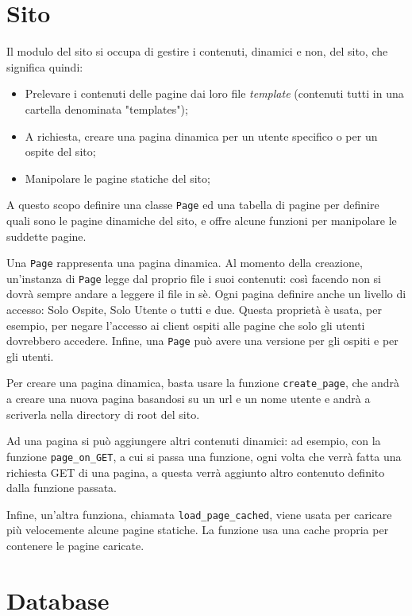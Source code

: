 \documentclass[a4paper,12pt]{report}
\begin{document}
\section{Sito}

Il modulo del sito si occupa di gestire i contenuti, dinamici e non, del sito, che significa quindi:

\begin{itemize}
\item Prelevare i contenuti delle pagine dai loro file \textit{template} (contenuti tutti in una cartella denominata "templates");
\item A richiesta, creare una pagina dinamica per un utente specifico o per un ospite del sito;
\item Manipolare le pagine statiche del sito;
\end{itemize}

A questo scopo definire una classe \texttt{Page} ed una tabella di pagine per definire quali sono le pagine dinamiche del sito, e offre alcune funzioni per manipolare le suddette pagine.

Una \texttt{Page} rappresenta una pagina dinamica. Al momento della creazione, un'instanza di \texttt{Page} legge dal proprio file i suoi contenuti: così facendo non si dovrà sempre andare a leggere il file in sè. Ogni pagina definire anche un livello di accesso: Solo Ospite, Solo Utente o tutti e due. Questa proprietà è usata, per esempio, per negare l'accesso ai client ospiti alle pagine che solo gli utenti dovrebbero accedere. Infine, una \texttt{Page} può avere una versione per gli ospiti e per gli utenti.

Per creare una pagina dinamica, basta usare la funzione \texttt{create\_page}, che andrà a creare una nuova pagina basandosi su un url e un nome utente e andrà a scriverla nella directory di root del sito.

Ad una pagina si può aggiungere altri contenuti dinamici: ad esempio, con la funzione \texttt{page\_on\_GET}, a cui si passa una funzione, ogni volta che verrà fatta una richiesta GET di una pagina, a questa verrà aggiunto altro contenuto definito dalla funzione passata.

Infine, un'altra funziona, chiamata \texttt{load\_page\_cached}, viene usata per caricare più velocemente alcune pagine statiche. La funzione usa una cache propria per contenere le pagine caricate.

\section{Database}
\end{document}
